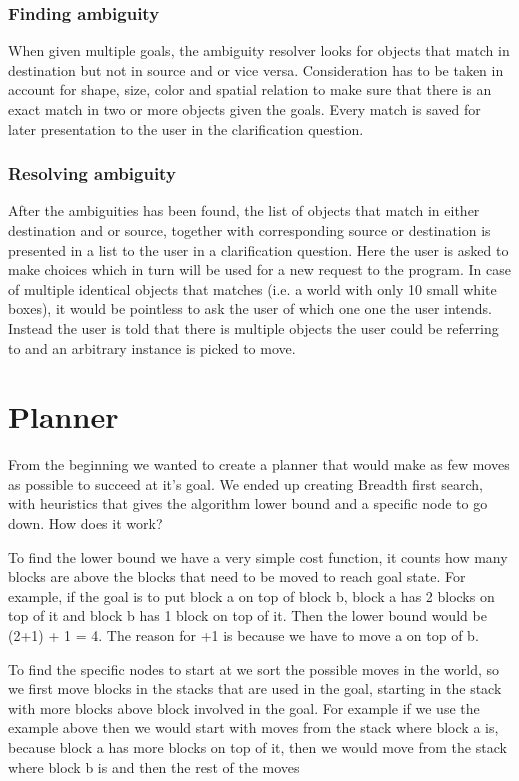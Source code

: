 \documentclass[11pt]{article}
\begin{document}
\subsubsection*{Finding ambiguity}
When given multiple goals, the ambiguity resolver looks for objects that match in destination but not in source and or vice versa. Consideration has to be taken in account for shape, size, color and spatial relation to make sure that there is an exact match in two or more objects given the goals. Every match is saved for later presentation to the user in the clarification question.

\subsubsection*{Resolving ambiguity}
After the ambiguities has been found, the list of  objects that match in either destination and or source, together with corresponding source or destination is presented in a list to the user in a clarification question. Here the user is asked to make choices which in turn will be used for a new request to the program.
In case of multiple identical objects that matches (i.e. a world with only 10 small white boxes), it would be pointless to ask the user of which one one the user intends. Instead the user is told that there is multiple objects the user could be referring to and an arbitrary instance is picked to move.

\section*{Planner}
From the beginning we wanted to create a planner that would make as few moves as possible to succeed at it's goal. We ended up creating Breadth first search, with heuristics that gives the algorithm lower bound and a specific node to go down. How does it work?

To find the lower bound we have a very simple cost function, it counts how many blocks are above the blocks that need to be moved to reach goal state. For example, if the goal is to put block a on top of block b, block a has 2 blocks on top of it and block b has 1 block on top of it. Then the lower bound would be (2+1) + 1 = 4. The reason for +1 is because we have to move a on top of b. 

To find the specific nodes to start at we sort the possible moves in the world, so we first move blocks in the stacks that are used in the goal, starting in the stack with more blocks above block involved in the goal. For example if we use the example above then we would  start with moves from the stack where block a is, because block a has more blocks on top of it, then we would move from the stack where block b is and then the rest of the moves
\end{document}

